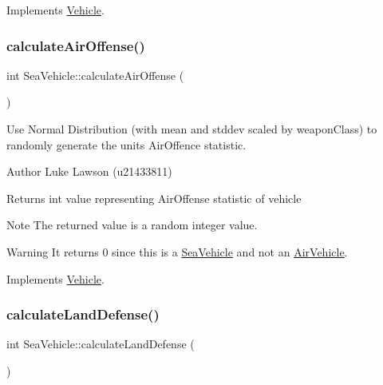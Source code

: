 Implements \mbox{\hyperlink{class_vehicle_ae87cbec24f436b431fbed096024c41c9}{Vehicle}}.

\mbox{\label{class_sea_vehicle_a24b41898db73af6d04ae91ddcf97f4a4}} 
\subsubsection{\texorpdfstring{calculateAirOffense()}{calculateAirOffense()}}
{\footnotesize\ttfamily int Sea\+Vehicle\+::calculate\+Air\+Offense (\begin{DoxyParamCaption}{ }\end{DoxyParamCaption})\hspace{0.3cm}{\ttfamily [virtual]}}



Use Normal Distribution (with mean and stddev scaled by weapon\+Class) to randomly generate the unit\textquotesingle{}s Air\+Offence statistic. 

\begin{DoxyAuthor}{Author}
Luke Lawson (u21433811) 
\end{DoxyAuthor}
\begin{DoxyReturn}{Returns}
int value representing Air\+Offense statistic of vehicle 
\end{DoxyReturn}
\begin{DoxyNote}{Note}
The returned value is a random integer value. 
\end{DoxyNote}
\begin{DoxyWarning}{Warning}
It returns 0 since this is a \mbox{\hyperlink{class_sea_vehicle}{Sea\+Vehicle}} and not an \mbox{\hyperlink{class_air_vehicle}{Air\+Vehicle}}. 
\end{DoxyWarning}


Implements \mbox{\hyperlink{class_vehicle_a0a6c6ed9d25c66415f83191894b11499}{Vehicle}}.

\mbox{\label{class_sea_vehicle_a0c86a5fe86057562bb7e7547e0183c8d}} 
\subsubsection{\texorpdfstring{calculateLandDefense()}{calculateLandDefense()}}
{\footnotesize\ttfamily int Sea\+Vehicle\+::calculate\+Land\+Defense (\begin{DoxyParamCaption}{ }\end{DoxyParamCaption})\hspace{0.3cm}{\ttfamily [virtual]}}



